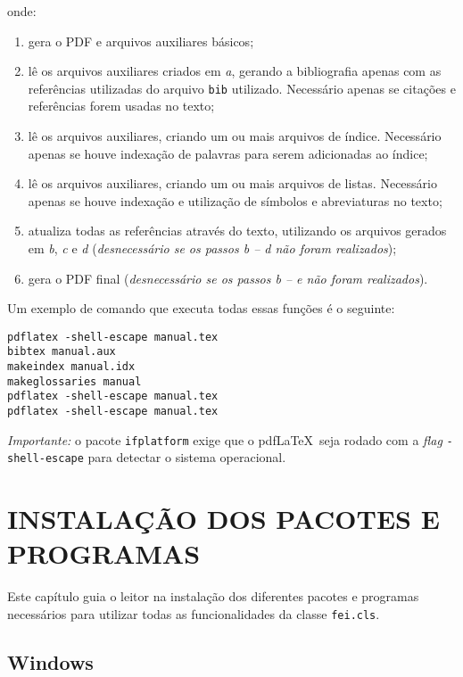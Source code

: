 \documentclass{fei}
\begin{document}
	onde:
	
	\begin{enumerate}
	\item gera o PDF e arquivos auxiliares básicos;
	\item lê os arquivos auxiliares criados em \emph{a}, gerando a bibliografia apenas com as referências utilizadas do arquivo \texttt{bib} utilizado. Necessário apenas se citações e referências forem usadas no texto;
	\item lê os arquivos auxiliares, criando um ou mais arquivos de índice. Necessário apenas se houve indexação de palavras para serem adicionadas ao índice;
	\item lê os arquivos auxiliares, criando um ou mais arquivos de listas. Necessário apenas se houve indexação e utilização de símbolos e abreviaturas no texto;
	\item atualiza todas as referências através do texto, utilizando os arquivos gerados em \emph{b}, \emph{c} e \emph{d} (\emph{desnecessário se os passos b -- d não foram realizados});
	\item gera o PDF final (\emph{desnecessário se os passos b -- e não foram realizados}).
	\end{enumerate}
	
	Um exemplo de comando que executa todas essas funções é o seguinte:
	
	\begin{verbatim}
pdflatex -shell-escape manual.tex
bibtex manual.aux
makeindex manual.idx
makeglossaries manual
pdflatex -shell-escape manual.tex
pdflatex -shell-escape manual.tex
	\end{verbatim}
	
	\emph{Importante:} o pacote \texttt{ifplatform} exige que o pdf\LaTeX\ seja rodado com a \emph{flag} \texttt{-shell-escape} para detectar o sistema operacional.
	
	\chapter{INSTALAÇÃO DOS PACOTES E PROGRAMAS}	\label{chap:instalacao}
	
	Este capítulo guia o leitor na instalação dos diferentes pacotes e programas necessários para utilizar todas as funcionalidades da classe \texttt{fei.cls}.
	
	\section{Windows}
	
\end{document}
